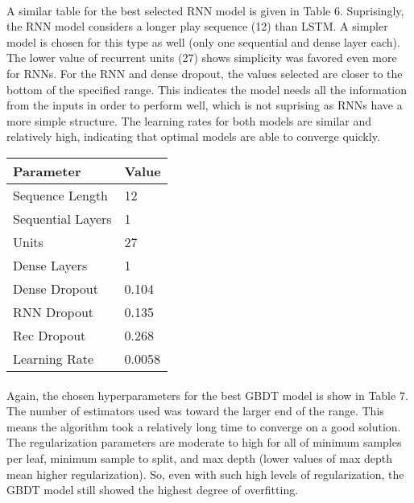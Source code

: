 \documentclass[11pt]{article}
\begin{document}
\begin{multicols*}{2}
            \paragraph{}
                A similar table for the best selected RNN model is given in Table 6.
                Suprisingly, the RNN model considers a longer play sequence (12) than LSTM. 
                A simpler model is chosen for this type as well (only one sequential and dense layer each).
                The lower value of recurrent units (27) shows simplicity was favored even more for RNNs.   
                For the RNN and dense dropout, the values selected are closer to the bottom of the specified range. 
                This indicates the model needs all the information from the inputs in order to perform well, which is not suprising as RNNs have a more simple structure.
                The learning rates for both models are similar and relatively high, indicating that optimal models are able to converge quickly.   
        \begin{center}
            \begin{tabular}{|| m{3cm} | m{3cm}||}
                \hline
                \textbf{Parameter} & \textbf{Value}  \\
                \hline\hline
                Sequence Length & 12  \\
                \hline
                Sequential Layers & 1 \\
                \hline
                Units & 27 \\
                \hline
                Dense Layers & 1 \\
                \hline
                Dense Dropout & 0.104 \\
                \hline
                RNN Dropout & 0.135 \\
                \hline
                Rec Dropout & 0.268 \\
                \hline
                Learning Rate & 0.0058\\
                \hline
                
            \end{tabular}
            \end{center}

            \paragraph{}
                Again, the chosen hyperparameters for the best GBDT model is show in Table 7.
                The number of estimators used was toward the larger end of the range. 
                This means the algorithm took a relatively long time to converge on a good solution.
                The regularization parameters are moderate to high for all of minimum samples per leaf, minimum sample to split, and max depth (lower values of max depth mean higher regularization).
                So, even with such high levels of regularization, the GBDT model still showed the highest degree of overfitting.  
                

\end{multicols*}
\end{document}
